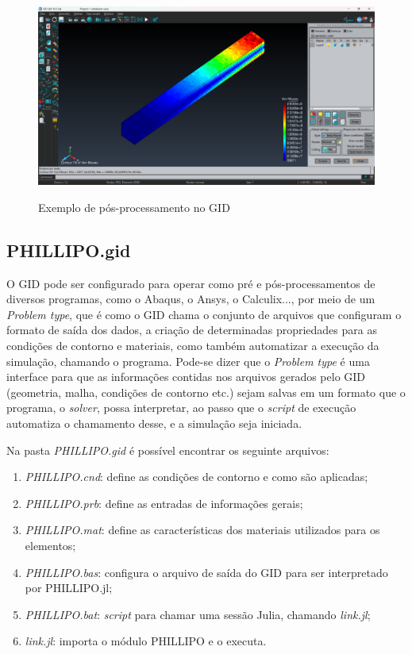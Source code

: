 \begin{figure}[hbtp]
    \centering
    \caption{Exemplo de pós-processamento no GID}
    \includegraphics[width = \textwidth]{Figuras/gid_2.png}
    \label{fig:gid_2}
\end{figure}


\subsection{PHILLIPO.gid}

O GID pode ser configurado para operar como pré e pós-processamentos de diversos programas, como o Abaqus, o Ansys, o Calculix..., por meio de um \emph{Problem type}, que é como o GID chama o conjunto de arquivos que configuram o formato de saída dos dados, a criação de determinadas propriedades para as condições de contorno e materiais, como também automatizar a execução da simulação, chamando o programa. Pode-se dizer que o \emph{Problem type} é uma interface para que as informações contidas nos arquivos gerados pelo GID (geometria, malha, condições de contorno etc.) sejam salvas em um formato que o programa, o \emph{solver}, possa interpretar, ao passo que o \emph{script} de execução automatiza o chamamento desse, e a simulação seja iniciada. 

Na pasta \emph{PHILLIPO.gid} é possível encontrar os seguinte arquivos:

\begin{enumerate}
    \item \emph{PHILLIPO.cnd}: define as condições de contorno e como são aplicadas;
    \item \emph{PHILLIPO.prb}: define as entradas de informações gerais;
    \item \emph{PHILLIPO.mat}: define as características dos materiais utilizados para os elementos;
    \item \emph{PHILLIPO.bas}: configura o arquivo de saída do GID para ser interpretado por PHILLIPO.jl;
    \item \emph{PHILLIPO.bat}: \emph{script} para chamar uma sessão Julia, chamando \emph{link.jl};
    \item \emph{link.jl}: importa o módulo PHILLIPO e o executa.
\end{enumerate}

